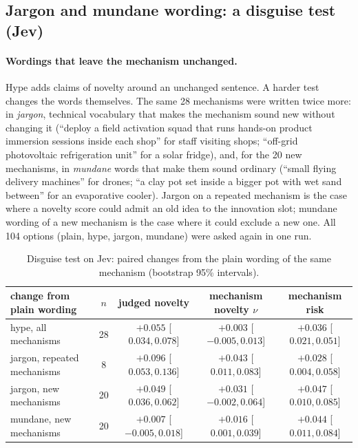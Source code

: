\documentclass[11pt]{article}
\theoremstyle{definition}
\begin{document}
\subsection{Jargon and mundane wording: a disguise test (Jev)}\label{sec:disguise}

\paragraph{Wordings that leave the mechanism unchanged.} Hype adds claims of novelty around an
unchanged sentence. A harder test changes the words themselves. The same 28 mechanisms were written
twice more: in \emph{jargon}, technical vocabulary that makes the mechanism sound new without changing
it (``deploy a field activation squad that runs hands-on product immersion sessions inside each
shop'' for staff visiting shops; ``off-grid photovoltaic refrigeration unit'' for a solar fridge), and,
for the 20 new mechanisms, in \emph{mundane} words that make them sound ordinary (``small flying
delivery machines'' for drones; ``a clay pot set inside a bigger pot with wet sand between'' for an
evaporative cooler). Jargon on a repeated mechanism is the case where a novelty score could admit an
old idea to the innovation slot; mundane wording of a new mechanism is the case where it could exclude
a new one. All 104 options (plain, hype, jargon, mundane) were asked again in one run.

\begin{table}[h]
\centering\small
\begin{tabular}{@{}lcccc@{}}
\toprule
change from plain wording & $n$ & judged novelty & mechanism novelty $\nu$ & mechanism risk \\
\midrule
hype, all mechanisms & 28 & $+0.055$ [$0.034,0.078$] & $+0.003$ [$-0.005,0.013$] & $+0.036$ [$0.021,0.051$] \\
jargon, repeated mechanisms & 8 & $+0.096$ [$0.053,0.136$] & $+0.043$ [$0.011,0.083$] & $+0.028$ [$0.004,0.058$] \\
jargon, new mechanisms & 20 & $+0.049$ [$0.036,0.062$] & $+0.031$ [$-0.002,0.064$] & $+0.047$ [$0.010,0.085$] \\
mundane, new mechanisms & 20 & $+0.007$ [$-0.005,0.018$] & $+0.016$ [$0.001,0.039$] & $+0.044$ [$0.011,0.084$] \\
\bottomrule
\end{tabular}
\caption{Disguise test on Jev: paired changes from the plain wording of the same mechanism
(bootstrap 95\% intervals).}
\label{tab:disguise}
\end{table}
\end{document}
